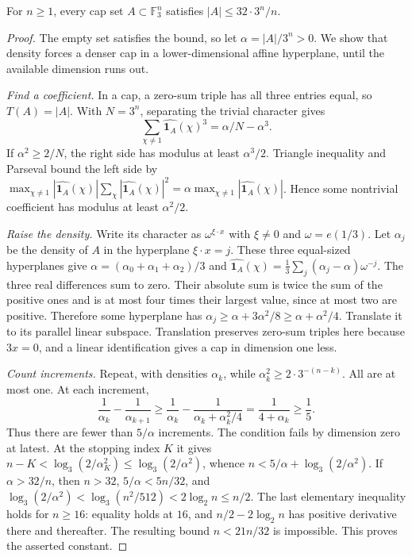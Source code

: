 \begin{theorem}[Meshulam, 1995]\label{thm:meshulam}
For $n\ge1$, every cap set $A\subset\mathbb F_3^n$ satisfies $|A|\le32\cdot3^n/n$.
\end{theorem}
\begin{proof}
The empty set satisfies the bound, so let $\alpha=|A|/3^n>0$. We show that density forces a denser cap in a lower-dimensional affine hyperplane, until the available dimension runs out.

\emph{Find a coefficient.} In a cap, a zero-sum triple has all three entries equal, so $T(A)=|A|$. With $N=3^n$, separating the trivial character gives
\[
\sum_{\chi\ne1}\widehat{\mathbf1_A}(\chi)^3=\alpha/N-\alpha^3.
\]
If $\alpha^2\ge2/N$, the right side has modulus at least $\alpha^3/2$. Triangle inequality and Parseval bound the left side by
$\max_{\chi\ne1}|\widehat{\mathbf1_A}(\chi)|\sum_\chi|\widehat{\mathbf1_A}(\chi)|^2
=\alpha\max_{\chi\ne1}|\widehat{\mathbf1_A}(\chi)|$.
Hence some nontrivial coefficient has modulus at least $\alpha^2/2$.

\emph{Raise the density.} Write its character as $\omega^{\xi\cdot x}$ with $\xi\ne0$ and $\omega=e(1/3)$. Let $\alpha_j$ be the density of $A$ in the hyperplane $\xi\cdot x=j$. These three equal-sized hyperplanes give
$\alpha=(\alpha_0+\alpha_1+\alpha_2)/3$ and
$\widehat{\mathbf1_A}(\chi)=\tfrac13\sum_j(\alpha_j-\alpha)\omega^{-j}$.
The three real differences sum to zero. Their absolute sum is twice the sum of the positive ones and is at most four times their largest value, since at most two are positive. Therefore some hyperplane has
$\alpha_j\ge\alpha+3\alpha^2/8\ge\alpha+\alpha^2/4$.
Translate it to its parallel linear subspace. Translation preserves zero-sum triples here because $3x=0$, and a linear identification gives a cap in dimension one less.

\emph{Count increments.} Repeat, with densities $\alpha_k$, while $\alpha_k^2\ge2\cdot3^{-(n-k)}$. All are at most one. At each increment,
\[
\frac1{\alpha_k}-\frac1{\alpha_{k+1}}
\ge\frac1{\alpha_k}-\frac1{\alpha_k+\alpha_k^2/4}
=\frac1{4+\alpha_k}\ge\frac15.
\]
Thus there are fewer than $5/\alpha$ increments. The condition fails by dimension zero at latest. At the stopping index $K$ it gives
$n-K<\log_3(2/\alpha_K^2)\le\log_3(2/\alpha^2)$, whence
$n<5/\alpha+\log_3(2/\alpha^2)$.
If $\alpha>32/n$, then $n>32$, $5/\alpha<5n/32$, and
$\log_3(2/\alpha^2)<\log_3(n^2/512)<2\log_2n\le n/2$.
The last elementary inequality holds for $n\ge16$: equality holds at $16$, and $n/2-2\log_2n$ has positive derivative there and thereafter. The resulting bound $n<21n/32$ is impossible. This proves the asserted constant.
\end{proof}

